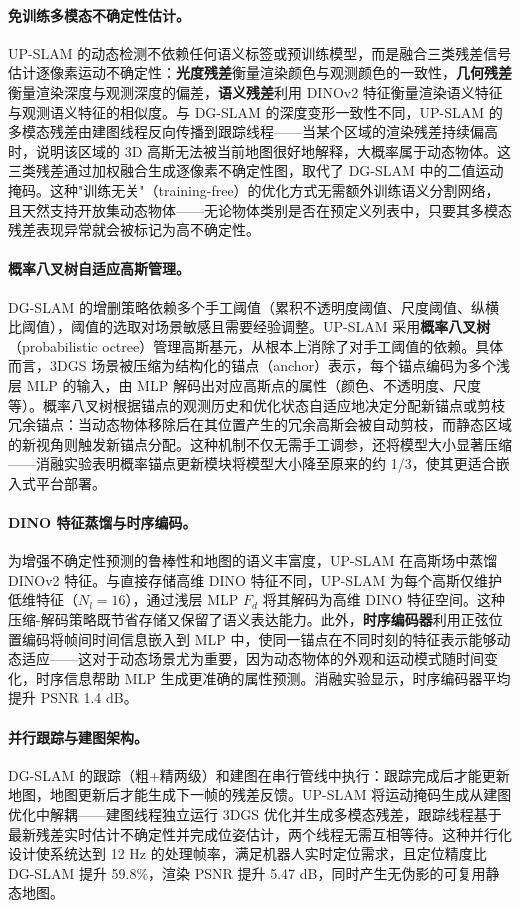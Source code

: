 \paragraph{免训练多模态不确定性估计。}
UP-SLAM 的动态检测不依赖任何语义标签或预训练模型，而是融合三类残差信号估计逐像素运动不确定性：\textbf{光度残差}衡量渲染颜色与观测颜色的一致性，\textbf{几何残差}衡量渲染深度与观测深度的偏差，\textbf{语义残差}利用 DINOv2 特征衡量渲染语义特征与观测语义特征的相似度。与 DG-SLAM 的深度变形一致性不同，UP-SLAM 的多模态残差由建图线程反向传播到跟踪线程——当某个区域的渲染残差持续偏高时，说明该区域的 3D 高斯无法被当前地图很好地解释，大概率属于动态物体。这三类残差通过加权融合生成逐像素不确定性图，取代了 DG-SLAM 中的二值运动掩码。这种"训练无关"（training-free）的优化方式无需额外训练语义分割网络，且天然支持开放集动态物体——无论物体类别是否在预定义列表中，只要其多模态残差表现异常就会被标记为高不确定性。

\paragraph{概率八叉树自适应高斯管理。}
DG-SLAM 的增删策略依赖多个手工阈值（累积不透明度阈值、尺度阈值、纵横比阈值），阈值的选取对场景敏感且需要经验调整。UP-SLAM 采用\textbf{概率八叉树}（probabilistic octree）管理高斯基元，从根本上消除了对手工阈值的依赖。具体而言，3DGS 场景被压缩为结构化的锚点（anchor）表示，每个锚点编码为多个浅层 MLP 的输入，由 MLP 解码出对应高斯点的属性（颜色、不透明度、尺度等）。概率八叉树根据锚点的观测历史和优化状态自适应地决定分配新锚点或剪枝冗余锚点：当动态物体移除后在其位置产生的冗余高斯会被自动剪枝，而静态区域的新视角则触发新锚点分配。这种机制不仅无需手工调参，还将模型大小显著压缩——消融实验表明概率锚点更新模块将模型大小降至原来的约 1/3，使其更适合嵌入式平台部署。

\paragraph{DINO 特征蒸馏与时序编码。}
为增强不确定性预测的鲁棒性和地图的语义丰富度，UP-SLAM 在高斯场中蒸馏 DINOv2 特征。与直接存储高维 DINO 特征不同，UP-SLAM 为每个高斯仅维护低维特征（$N_l=16$），通过浅层 MLP $F_d$ 将其解码为高维 DINO 特征空间。这种压缩-解码策略既节省存储又保留了语义表达能力。此外，\textbf{时序编码器}利用正弦位置编码将帧间时间信息嵌入到 MLP 中，使同一锚点在不同时刻的特征表示能够动态适应——这对于动态场景尤为重要，因为动态物体的外观和运动模式随时间变化，时序信息帮助 MLP 生成更准确的属性预测。消融实验显示，时序编码器平均提升 PSNR 1.4 dB。

\paragraph{并行跟踪与建图架构。}
DG-SLAM 的跟踪（粗+精两级）和建图在串行管线中执行：跟踪完成后才能更新地图，地图更新后才能生成下一帧的残差反馈。UP-SLAM 将运动掩码生成从建图优化中解耦——建图线程独立运行 3DGS 优化并生成多模态残差，跟踪线程基于最新残差实时估计不确定性并完成位姿估计，两个线程无需互相等待。这种并行化设计使系统达到 12 Hz 的处理帧率，满足机器人实时定位需求，且定位精度比 DG-SLAM 提升 59.8\%，渲染 PSNR 提升 5.47 dB，同时产生无伪影的可复用静态地图。

